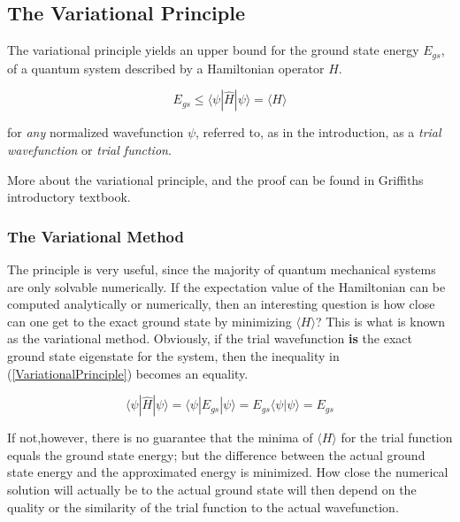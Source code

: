 \documentclass[aip,nobalancelastpage,
twocolumn,
rsi,%
 amsmath,amssymb,
 reprint,%
]{revtex4}
\begin{document}
\subsection{The Variational Principle}
The variational principle yields an upper bound for the ground state energy $E_{gs}$, of a quantum system described by a Hamiltonian operator $\hat{H}$.

\begin{equation}
\label{VariationalPrinciple}
E_{gs} \leq \langle \psi| \hat{H} | \psi \rangle = \langle H \rangle
\end{equation}

for \textit{any} normalized wavefunction $\psi$, referred to, as in the introduction, as a \textit{trial wavefunction} or \textit{trial function}. 
\par More about the variational principle, and the proof can be found in Griffiths introductory textbook\cite[pg.293]{Griffiths}.\par

\subsubsection{The Variational Method}

The principle is very useful, since the majority of quantum mechanical systems are only solvable numerically. If the expectation value of the Hamiltonian can be computed analytically or numerically, then an interesting question is how close can one get to the exact ground state by minimizing $\langle H \rangle$? This is what is known as the variational method. Obviously, if the trial wavefunction \textbf{is} the exact ground state eigenstate for the system, then the inequality in (\ref{VariationalPrinciple}) becomes an equality.

\begin{equation}
\langle \psi| \hat{H} | \psi \rangle = \langle \psi| E_{gs} |\psi \rangle = E_{gs}\langle\psi | \psi \rangle = E_{gs}
\end{equation}

If not,however, there is no guarantee that the minima of $\langle H \rangle$ for the trial function equals the ground state energy; but the difference between the actual ground state energy and the approximated energy is minimized. How close the numerical solution will actually be to the actual ground state will then depend on the quality or the similarity of the trial function to the actual wavefunction.\par
\end{document}
